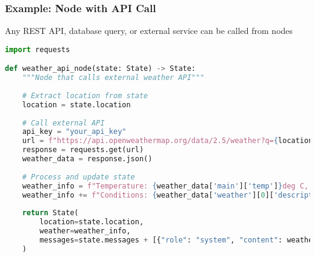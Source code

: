 \begin{frame}[fragile]\frametitle{Example: Node with API Call}
 Any REST API, database query, or external service can be called from nodes
 
      \begin{lstlisting}[language=Python, basicstyle=\tiny]
import requests

def weather_api_node(state: State) -> State:
    """Node that calls external weather API"""
    
    # Extract location from state
    location = state.location
    
    # Call external API
    api_key = "your_api_key"
    url = f"https://api.openweathermap.org/data/2.5/weather?q={location}&appid={api_key}"
    response = requests.get(url)
    weather_data = response.json()
    
    # Process and update state
    weather_info = f"Temperature: {weather_data['main']['temp']}deg C, "
    weather_info += f"Conditions: {weather_data['weather'][0]['description']}"
    
    return State(
        location=state.location,
        weather=weather_info,
        messages=state.messages + [{"role": "system", "content": weather_info}]
    )
      \end{lstlisting}
      
\end{frame}

